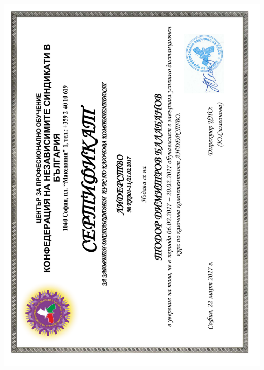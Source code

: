 \documentclass[bulgarian,a4paper]{europasscv}
\begin{document}
\includegraphics[width=\textwidth,height=\textheight,keepaspectratio]{KNSB2017_2}
\end{document}
